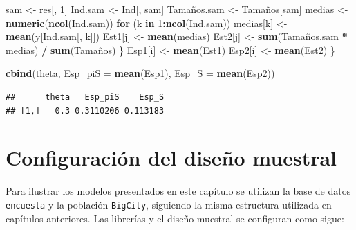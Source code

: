 \documentclass[
  spanish,
  12pt,
]{book}
\newenvironment{Shaded}{\begin{snugshade}}{\end{snugshade}}
\newcommand{\AttributeTok}[1]{\textcolor[rgb]{0.13,0.29,0.53}{#1}}
\newcommand{\ControlFlowTok}[1]{\textcolor[rgb]{0.13,0.29,0.53}{\textbf{#1}}}
\newcommand{\DecValTok}[1]{\textcolor[rgb]{0.00,0.00,0.81}{#1}}
\newcommand{\FunctionTok}[1]{\textcolor[rgb]{0.13,0.29,0.53}{\textbf{#1}}}
\newcommand{\NormalTok}[1]{#1}
\newcommand{\OtherTok}[1]{\textcolor[rgb]{0.56,0.35,0.01}{#1}}
\newcommand{\SpecialCharTok}[1]{\textcolor[rgb]{0.81,0.36,0.00}{\textbf{#1}}}
\begin{document}
\begin{Shaded}
\begin{Highlighting}[]
\NormalTok{    sam         }\OtherTok{\textless{}{-}}\NormalTok{ res[, }\DecValTok{1}\NormalTok{]}
\NormalTok{    Ind.sam     }\OtherTok{\textless{}{-}}\NormalTok{ Ind[, sam]}
\NormalTok{    Tamaños.sam }\OtherTok{\textless{}{-}}\NormalTok{ Tamaños[sam]}
\NormalTok{    medias      }\OtherTok{\textless{}{-}} \FunctionTok{numeric}\NormalTok{(}\FunctionTok{ncol}\NormalTok{(Ind.sam))}
    \ControlFlowTok{for}\NormalTok{ (k }\ControlFlowTok{in} \DecValTok{1}\SpecialCharTok{:}\FunctionTok{ncol}\NormalTok{(Ind.sam)) medias[k] }\OtherTok{\textless{}{-}} \FunctionTok{mean}\NormalTok{(y[Ind.sam[, k]])}
\NormalTok{    Est1[j] }\OtherTok{\textless{}{-}} \FunctionTok{mean}\NormalTok{(medias)}
\NormalTok{    Est2[j] }\OtherTok{\textless{}{-}} \FunctionTok{sum}\NormalTok{(Tamaños.sam }\SpecialCharTok{*}\NormalTok{ medias) }\SpecialCharTok{/} \FunctionTok{sum}\NormalTok{(Tamaños)}
\NormalTok{  \}}
\NormalTok{  Esp1[i] }\OtherTok{\textless{}{-}} \FunctionTok{mean}\NormalTok{(Est1)}
\NormalTok{  Esp2[i] }\OtherTok{\textless{}{-}} \FunctionTok{mean}\NormalTok{(Est2)}
\NormalTok{\}}

\FunctionTok{cbind}\NormalTok{(theta, }\AttributeTok{Esp\_piS =} \FunctionTok{mean}\NormalTok{(Esp1), }\AttributeTok{Esp\_S =} \FunctionTok{mean}\NormalTok{(Esp2))}
\end{Highlighting}
\end{Shaded}

\begin{verbatim}
##      theta   Esp_piS    Esp_S
## [1,]   0.3 0.3110206 0.113183
\end{verbatim}

\section{Configuración del diseño muestral}\label{configuraciuxf3n-del-diseuxf1o-muestral}

Para ilustrar los modelos presentados en este capítulo se utilizan la base de datos \texttt{encuesta} y la población \texttt{BigCity}, siguiendo la misma estructura utilizada en capítulos anteriores. Las librerías y el diseño muestral se configuran como sigue:
\end{document}
